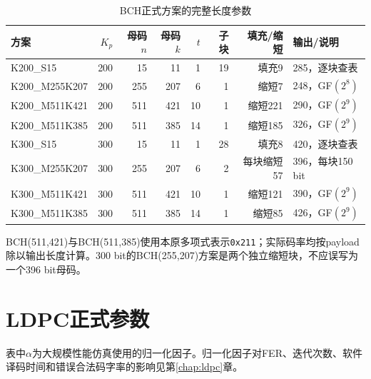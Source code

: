 \begin{table}[htbp]
  \centering
  \scriptsize
  \caption{BCH正式方案的完整长度参数}
  \label{tab:app-bch-parameters}
  \begin{tabular}{p{}rrrrrrp{}}
    \toprule
    方案 & $K_p$ & 母码$n$ & 母码$k$ & $t$ & 子块 & 填充/缩短 & 输出/说明 \\
    \midrule
    K200\_S15 & 200 & 15 & 11 & 1 & 19 & 填充9 & 285，逐块查表 \\
    K200\_M255K207 & 200 & 255 & 207 & 6 & 1 & 缩短7 & 248，GF$(2^8)$ \\
    K200\_M511K421 & 200 & 511 & 421 & 10 & 1 & 缩短221 & 290，GF$(2^9)$ \\
    K200\_M511K385 & 200 & 511 & 385 & 14 & 1 & 缩短185 & 326，GF$(2^9)$ \\
    K300\_S15 & 300 & 15 & 11 & 1 & 28 & 填充8 & 420，逐块查表 \\
    K300\_M255K207 & 300 & 255 & 207 & 6 & 2 & 每块缩短57 & 396，每块150 bit \\
    K300\_M511K421 & 300 & 511 & 421 & 10 & 1 & 缩短121 & 390，GF$(2^9)$ \\
    K300\_M511K385 & 300 & 511 & 385 & 14 & 1 & 缩短85 & 426，GF$(2^9)$ \\
    \bottomrule
  \end{tabular}
\end{table}

BCH(511,421)与BCH(511,385)使用本原多项式表示\texttt{0x211}；实际码率均按payload除以输出长度计算。300 bit的BCH(255,207)方案是两个独立缩短块，不应误写为一个396 bit母码。

\section{LDPC正式参数}\label{app:ldpc-parameters}
\begin{table}[htbp]\centering\scriptsize\caption{LDPC正式配置摘要}\label{tab:app-ldpc-parameters}
\end{table}
表中$\alpha$为大规模性能仿真使用的归一化因子。归一化因子对FER、迭代次数、软件译码时间和错误合法码字率的影响见第\ref{chap:ldpc}章。
